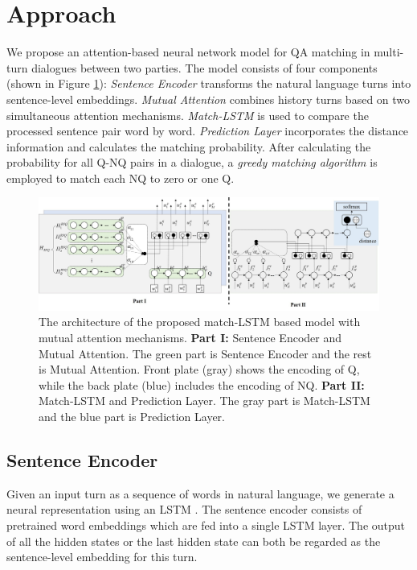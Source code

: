 \section{Approach}
\label{sec:method}


We propose an attention-based neural network model for QA matching 
in multi-turn dialogues between two parties. 
The model consists of four components (shown in Figure \ref{fig:model1}): 
\textit{Sentence Encoder} transforms the natural language turns into 
sentence-level embeddings. \textit{Mutual Attention} combines history turns 
based on two simultaneous attention mechanisms. 
\textit{Match-LSTM} is used to compare the processed sentence pair word by word. 
\textit{Prediction Layer} incorporates the distance information 
and calculates the matching probability. After calculating the probability for 
all Q-NQ pairs in a dialogue, a \textit{greedy matching algorithm} is employed to
match each NQ to zero or one Q.


\begin{figure}
	\centering
	\includegraphics[scale=0.40]{pic_model.pdf}
	\caption{The architecture of the proposed match-LSTM based model with mutual attention mechanisms. \textbf{Part I:} Sentence Encoder and Mutual Attention.
The green part is Sentence Encoder and the rest is Mutual Attention. Front plate
(gray) shows the encoding of Q, while the back plate (blue) includes the encoding of NQ. \textbf{Part II:} Match-LSTM and Prediction Layer. The gray part is Match-LSTM and the blue part is Prediction Layer.}
	
	\label{fig:model1}
\end{figure}

\subsection{Sentence Encoder}
\label{sec:sentence-encoder}

Given an input turn as a sequence of words in natural language, we generate a neural representation using an LSTM \cite{gers1999learning}. The sentence encoder consists of pretrained word embeddings which are fed into a single LSTM layer. The output of all the hidden states or the last hidden state can both be regarded as the sentence-level embedding for this turn.

